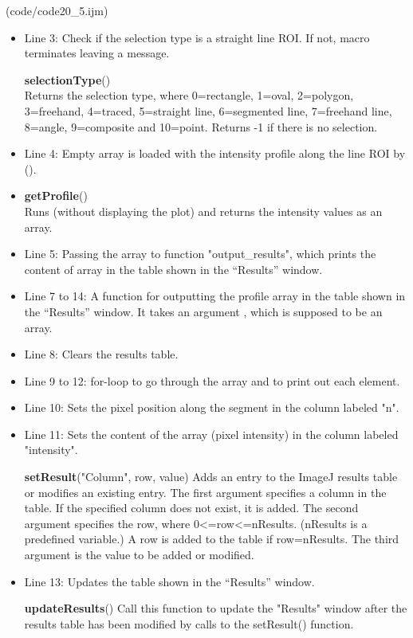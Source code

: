 (code/code20_5.ijm)

\begin{itemize}
\item Line 3: Check if the selection type is a straight line ROI. If not, macro terminates leaving a message. 

\begin{indentCom}
\textbf{selectionType}()\\ 
Returns the selection type, where 0=rectangle, 1=oval, 2=polygon, 3=freehand, 4=traced, 5=straight line, 6=segmented line, 7=freehand line, 8=angle, 9=composite and 10=point. Returns -1 if there is no selection.
\end{indentCom}

\item Line 4: Empty array  is loaded with the intensity profile along the line ROI by ().
\item
\begin{indentCom}
\textbf{getProfile}()\\
Runs  (without displaying the plot) and returns the intensity values as an array.
\end{indentCom}

\item Line 5: Passing the array  to function "output\_results", which prints the content of array in the table shown in the ``Results'' window. 

\item Line 7 to 14: A function for outputting the profile array in the table shown in the ``Results'' window. It takes an argument , which is supposed to be an array. 
\item Line 8: Clears the results table. 
\item Line 9 to 12: for-loop to go through the array and to print out each element. 
\item Line 10: Sets the pixel position along the segment in the column labeled "n". 
\item Line 11: Sets the content of the array (pixel intensity) in the column labeled "intensity".

\begin{indentCom}
\textbf{setResult}("Column", row, value)
Adds an entry to the ImageJ results table or modifies an existing entry. The first argument specifies a column in the table. If the specified column does not exist, it is added. The second argument specifies the row, where 0<=row<=nResults. (nResults is a predefined variable.) A row is added to the table if row=nResults. The third argument is the value to be added or modified. 
\end{indentCom}
\item Line 13: Updates the table shown in the ``Results'' window. 

\begin{indentCom}
\textbf{updateResults}()
Call this function to update the "Results" window after the results table has been modified by calls to the setResult() function. 
\end{indentCom}
\end{itemize}

